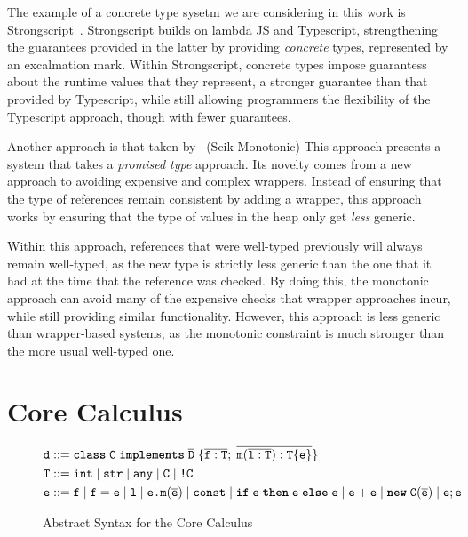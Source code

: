 \documentclass{llncs}
\newcommand{\kewif}{\texttt{\textbf{if}}}
\newcommand{\kewthen}{\texttt{\textbf{then}}}
\newcommand{\kewelse}{\texttt{\textbf{else}}}
\newcommand{\kewnew}{\texttt{\textbf{new}}}
\newcommand{\kewclass}{\texttt{\textbf{class}}}
\newcommand{\kewimplements}{\texttt{\textbf{implements}}}
\newcommand{\class}[4]{\ensuremath\kewclass\; \texttt{#1}\; \kewimplements\; {#2} \;\{#3;\;#4\}}
\newcommand{\field}[2]{\ensuremath \texttt{#1} : \texttt{#2}}
\newcommand{\method}[4]{\ensuremath {\texttt{#1}}({#2}):\texttt{#3} \{\texttt{#4}\}}
\newcommand{\ifabs}[3]{\kewif \; #1 \;\kewthen\; #2 \;\kewelse\; #3}
\newcommand{\opplus}[2]{#1 + #2}
\newcommand{\newclass}[2]{\kewnew\;\texttt{#1}(#2)}
\newcommand{\strt}{\texttt{str}}
\newcommand{\intt}{\texttt{int}}
\newcommand{\anyt}{\texttt{any}}
\newcommand{\vbar}{\;|\;}
\begin{document}
The example of a concrete type sysetm we are considering in this work is
Strongscript~\cite{stongscript}. Strongscript builds on lambda JS and 
Typescript, strengthening the guarantees provided in the latter by providing
\emph{concrete} types, represented by an excalmation mark. Within Strongscript,
concrete types impose guarantess about the runtime values that they represent, 
a stronger guarantee than that provided by Typescript, while still allowing
programmers the flexibility of the Typescript approach, though with fewer
guarantees.

Another approach is that taken by~\cite{seik-monotonic} (Seik Monotonic)
This approach presents a system that takes a \emph{promised type} approach.
Its novelty comes from a new approach to avoiding expensive and complex
wrappers. Instead of ensuring that the type of references remain consistent
by adding a wrapper, this approach works by ensuring that the type of values in
the heap only get \emph{less} generic.

Within this approach, references that were well-typed previously will always
remain well-typed, as the new type is strictly less generic than the one that
it had at the time that the reference was checked. By doing this, the monotonic
approach can avoid many of the expensive checks that wrapper approaches incur, 
while still providing similar functionality. However, this approach is less
generic than wrapper-based systems, as the monotonic constraint is much stronger
than the more usual well-typed one.

\section{Core Calculus}

\begin{figure}
\begin{align*}
\texttt{d}&::= \class{C}{\overline{\texttt{D}}}{\overline{\field{f}{T}}}{\overline{\method{m}{\overline{\field{l}{T}}}{T}{e}}}\\
\texttt{T} &::= \intt \vbar \strt \vbar \anyt \vbar \texttt{C} \vbar \texttt{!C}\\
\texttt{e}&::= \texttt{f} \vbar \texttt{f} = \texttt{e} \vbar \texttt{l} \vbar \texttt{e.m}(\overline{\texttt{e}}) \vbar \texttt{const} \vbar 
\ifabs{\texttt{e}}{\texttt{e}}{\texttt{e}} \vbar \opplus{\texttt{e}}{\texttt{e}} \vbar \newclass{\texttt{C}}{\overline{\texttt{e}}} \vbar \texttt{e}; \texttt{e}
\end{align*}

\caption{Abstract Syntax for the Core Calculus}
\end{figure}
\end{document}
